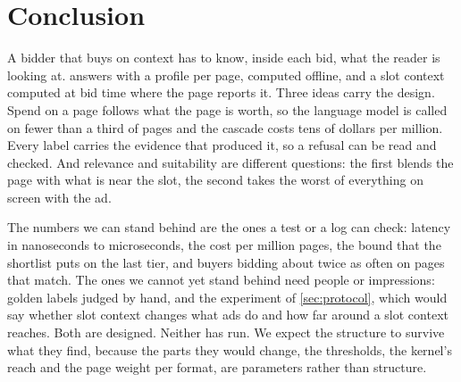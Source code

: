 \section{Conclusion}\label{sec:conclusion}

A bidder that buys on context has to know, inside each bid, what the reader is looking at. \sys{} answers with a profile per page, computed offline, and a slot context computed at bid time where the page reports it. Three ideas carry the design. Spend on a page follows what the page is worth, so the language model is called on fewer than a third of pages and the cascade costs tens of dollars per million. Every label carries the evidence that produced it, so a refusal can be read and checked. And relevance and suitability are different questions: the first blends the page with what is near the slot, the second takes the worst of everything on screen with the ad.

The numbers we can stand behind are the ones a test or a log can check: latency in nanoseconds to microseconds, the cost per million pages, the bound that the shortlist puts on the last tier, and buyers bidding about twice as often on pages that match. The ones we cannot yet stand behind need people or impressions: golden labels judged by hand, and the experiment of \cref{sec:protocol}, which would say whether slot context changes what ads do and how far around a slot context reaches. Both are designed. Neither has run. We expect the structure to survive what they find, because the parts they would change, the thresholds, the kernel's reach and the page weight per format, are parameters rather than structure.
